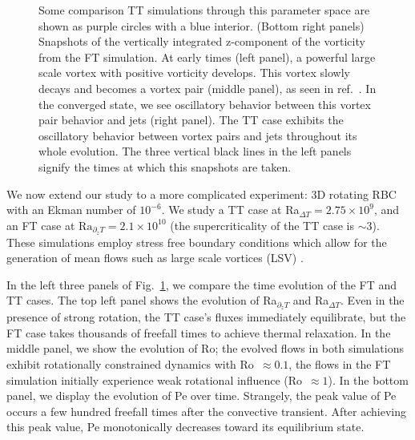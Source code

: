 \documentclass[aps, pre, onecolumn, nofootinbib, notitlepage, groupedaddress, amsfonts, amssymb, amsmath, longbibliography, superscriptaddress]{revtex4-1}
\begin{document}
\begin{figure}
{	Some comparison TT simulations through this parameter space are shown as purple circles with a blue interior.
	(Bottom right panels) Snapshots of the vertically integrated z-component of the vorticity from the FT simulation.
	At early times (left panel), a powerful large scale vortex with positive vorticity develops.
	This vortex slowly decays and becomes a vortex pair (middle panel), as seen in ref.~\cite{stellmach&all2014}.
	In the converged state, we see oscillatory behavior between this vortex pair behavior and jets (right panel).
	The TT case exhibits the oscillatory behavior between vortex pairs and jets throughout its whole evolution.
	The three vertical black lines in the left panels signify the times at which this snapshots are taken.
\label{fig:rotating_panels} }
\end{figure}



We now extend our study to a more complicated experiment: 3D rotating RBC with an Ekman number of $10^{-6}$.
We study a TT case at Ra$_{\Delta T} = 2.75\times 10^9$, and an FT case at $\text{Ra}_{\partial_z T} = 2.1 \times 10^{10}$ (the supercriticality of the TT case is $\sim 3$).
These simulations employ stress free boundary conditions which allow for the generation of mean flows such as large scale vortices (LSV) \cite{couston&all2019}.

In the left three panels of Fig.~\ref{fig:rotating_panels}, we compare the time evolution of the FT and TT cases.
The top left panel shows the evolution of Ra$_{\partial_z T}$ and Ra$_{\Delta T}$.
Even in the presence of strong rotation, the TT case's fluxes immediately equilibrate, but the FT case takes thousands of freefall times to achieve thermal relaxation.
In the middle panel, we show the evolution of Ro; the evolved flows in both simulations exhibit rotationally constrained dynamics with Ro $\,\approx 0.1$, the flows in the FT simulation initially experience weak rotational influence (Ro $\,\approx 1$).
In the bottom panel, we display the evolution of Pe over time.
Strangely, the peak value of Pe occurs a few hundred freefall times after the convective transient.
After achieving this peak value, Pe monotonically decreases toward its equilibrium state.
\end{document}
